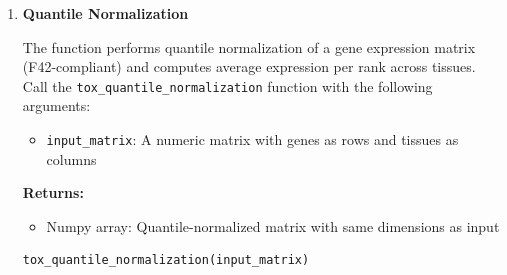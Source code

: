 \begin{enumerate}
\begin{enumerate}
                  The function normalizes each gene's expression vector using \texttt{sqrt(mean(x\textasciicircum
                    2))} across tissues (not classical standard deviation). Call the \texttt{tox\_normalize\_by\_std\_dev}
                  function with the following arguments:
                  
                  \begin{itemize}
                    \item \texttt{input\_matrix}: A numeric matrix with genes as rows and
                          tissues as columns
                  \end{itemize}
                  
                  \textbf{Returns:}
                  \begin{itemize}
                    \item Numpy array: Contains a normalized matrix with same dimensions
                          as input
                  \end{itemize}
                  \begin{lstlisting}[language=Python, caption={Python Standard Deviation Normalization}]
tox_normalize_by_std_dev(input_matrix)
                  \end{lstlisting}
                  
            \item \textbf{Quantile Normalization}
                  
                  The function performs quantile normalization of a gene expression matrix
                  (F42-compliant) and computes average expression per rank across tissues.
                  Call the \texttt{tox\_quantile\_normalization} function with the following
                  arguments:
                  
                  \begin{itemize}
                    \item \texttt{input\_matrix}: A numeric matrix with genes as rows and
                          tissues as columns
                  \end{itemize}
                  
                  \textbf{Returns:}
                  \begin{itemize}
                    \item Numpy array: Quantile-normalized matrix with same dimensions
                          as input
                  \end{itemize}
                  \begin{lstlisting}[language=Python, caption={Python Quantile Normalization}]
tox_quantile_normalization(input_matrix)
                  \end{lstlisting}
                  

\end{enumerate}
\end{enumerate}

